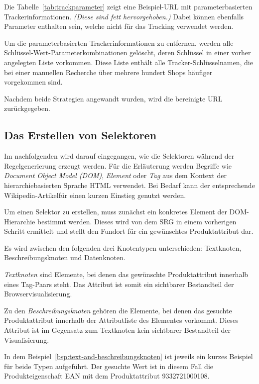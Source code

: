 Die Tabelle~\ref{tab:trackparameter} zeigt eine Beispiel-URL mit parameterbasierten Trackerinformationen.
\textit{(Diese sind fett hervorgehoben.)}
Dabei können ebenfalls Parameter enthalten sein, welche nicht für das Tracking verwendet werden.

Um die parameterbasierten Trackerinformationen zu entfernen, werden alle Schlüssel-Wert-Parameterkombinationen
gelöscht, deren Schlüssel in einer vorher angelegten Liste vorkommen.
Diese Liste enthält alle Tracker-Schlüsselnamen, die bei einer manuellen Recherche über mehrere hundert Shops
häufiger vorgekommen sind.

Nachdem beide Strategien angewandt wurden, wird die bereinigte URL zurückgegeben.

\subsection{Das Erstellen von Selektoren}
\label{subsec:erstellen-von-selektoren}

Im nachfolgenden wird darauf eingegangen, wie die Selektoren während der Regelgenerierung erzeugt werden.
Für die Erläuterung werden Begriffe wie \textit{Document Object Model (DOM)}, \textit{Element} oder \textit{Tag} aus
dem Kontext der hierarchiebasierten Sprache HTML verwendet.
Bei Bedarf kann der entsprechende Wikipedia-Artikel\footnotemark für einen kurzen Einstieg genutzt werden.

Um einen Selektor zu erstellen, muss zunächst ein konkretes Element der DOM-Hierarchie bestimmt werden.
Dieses wird von dem SRG in einem vorherigen Schritt ermittelt und stellt den Fundort für ein gewünschtes
Produktattribut dar.

Es wird zwischen den folgenden drei Knotentypen unterschieden: Textknoten, Beschreibungsknoten und Datenknoten.

\textit{Textknoten} sind Elemente, bei denen das gewünschte Produktattribut innerhalb eines Tag-Paars steht.
Das Attribut ist somit ein sichtbarer Bestandteil der Browservisualisierung.

Zu den \textit{Beschreibungsknoten} gehören die Elemente, bei denen das gesuchte Produktattribut innerhalb der
Attributliste des Elementes vorkommt.
Dieses Attribut ist im Gegensatz zum Textknoten kein sichtbarer Bestandteil der Visualisierung.

In dem Beispiel~\ref{bsp:text-and-beschreibungsknoten} ist jeweils ein kurzes Beispiel für beide Typen aufgeführt.
Der gesuchte Wert ist in diesem Fall die Produkteigenschaft EAN mit dem Produktattribut 9332721000108.

